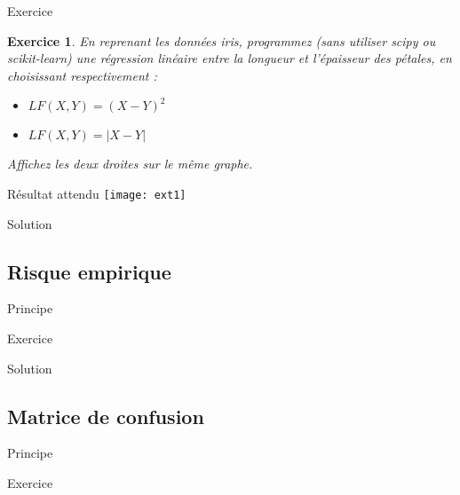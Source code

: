 \documentclass[11pt]{beamer}
\newtheorem{exercice}{Exercice}
\newcommand{\Python}[1]{
	{\small	}
}
\begin{document}
\begin{frame}{Exercice}
\begin{exercice}
En reprenant les données iris, programmez (sans utiliser scipy ou scikit-learn) une régression linéaire entre la longueur et l'épaisseur des pétales, en choisissant respectivement :
\begin{itemize}
	\item $LF(X,Y) = (X-Y)^2$
	\item $LF(X,Y) = |X-Y|$
\end{itemize}
Affichez les deux droites sur le même graphe.
\end{exercice}

\end{frame}

\begin{frame}{Résultat attendu}
\texttt{[image: ext1]}
\end{frame}

\begin{frame}{Solution}
\Python{ext1.py}
\end{frame}

\subsection{Risque empirique}

\begin{frame}{Principe}

\end{frame}

\begin{frame}{Exercice}

\end{frame}

\begin{frame}{Solution}

\end{frame}

\subsection{Matrice de confusion}

\begin{frame}{Principe}

\end{frame}

\begin{frame}{Exercice}

\end{frame}
\end{document}
